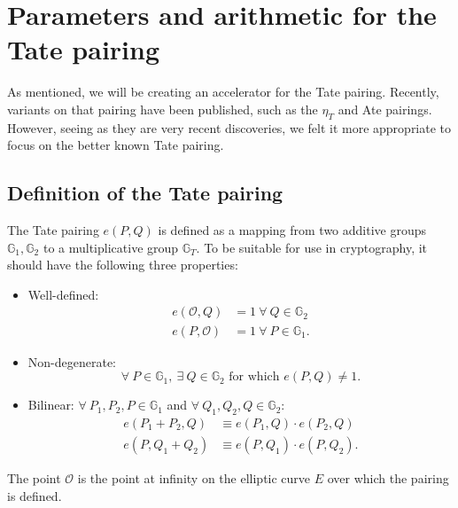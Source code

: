 \section{Parameters and arithmetic for the Tate pairing\label{section-pairings}}

As mentioned, we will be creating an accelerator for the Tate pairing. Recently, variants on that pairing have been published, such as the $\eta_T$ \cite{eta} and Ate \cite{ate} pairings. However, seeing as they are very recent discoveries, we felt it more appropriate to focus on the better known Tate pairing.

\subsection{Definition of the Tate pairing}

The Tate pairing $e(P, Q)$ is defined as a mapping from two additive groups $\mathbb{G}_1, \mathbb{G}_2$ to a multiplicative group $\mathbb{G}_T$. To be suitable for use in cryptography, it should have the following three properties:
\begin{itemize}
	\item Well-defined:%
		\begin{displaymath}\begin{aligned}
			e(\mathcal{O}, Q) &= 1 \: \forall \: Q \in \mathbb{G}_2\\
			e(P, \mathcal{O}) &= 1 \: \forall \: P \in \mathbb{G}_1.
		\end{aligned}\end{displaymath}
	
	\item Non-degenerate:%
		\begin{displaymath}\forall \: P \in \mathbb{G}_1, \: \exists \: Q \in \mathbb{G}_2 \text{ for which } e(P, Q) \neq 1.\end{displaymath}
	
	\item Bilinear: $\forall \: P_1, P_2, P \in \mathbb{G}_1$ and $\forall \: Q_1, Q_2, Q \in \mathbb{G}_2$:%
		\begin{displaymath}\begin{aligned}
			e(P_1 + P_2, Q) &\equiv e(P_1, Q) \cdot e(P_2, Q)\\
			e(P, Q_1 + Q_2) &\equiv e(P, Q_1) \cdot e(P, Q_2).
		\end{aligned}\end{displaymath}
\end{itemize}
The point $\mathcal{O}$ is the point at infinity on the elliptic curve $E$ over which the pairing is defined.

